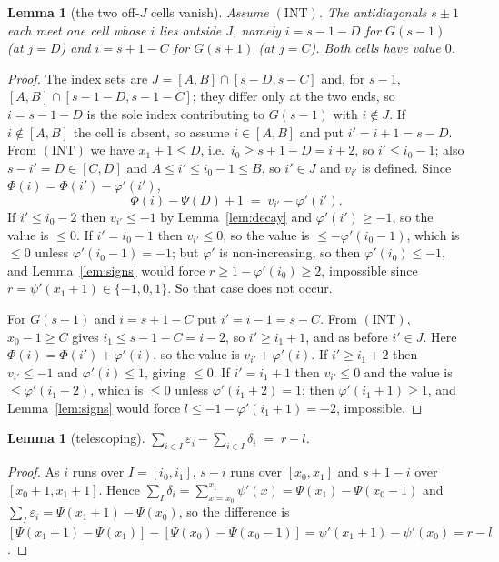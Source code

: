 \documentclass[11pt]{article}
\newtheorem{lemma}[theorem]{Lemma}
\theoremstyle{definition}
\newcommand{\INT}{(\mathrm{INT})}
\begin{document}
\begin{lemma}[the two off-$J$ cells vanish]\label{lem:offJ}
Assume $\INT$. The antidiagonals $s\pm1$ each meet one cell whose $i$ lies outside $J$,
namely $i=s-1-D$ for $G(s-1)$ (at $j=D$) and $i=s+1-C$ for $G(s+1)$ (at $j=C$). Both
cells have value $0$.
\end{lemma}
\begin{proof}
The index sets are $J=[A,B]\cap[s-D,s-C]$ and, for $s-1$, $[A,B]\cap[s-1-D,s-1-C]$; they
differ only at the two ends, so $i=s-1-D$ is the sole index contributing to $G(s-1)$ with
$i\notin J$. If $i\notin[A,B]$ the cell is absent, so assume $i\in[A,B]$ and put
$i'=i+1=s-D$. From $\INT$ we have $x_1+1\le D$, i.e.\ $i_0\ge s+1-D=i+2$, so
$i'\le i_0-1$; also $s-i'=D\in[C,D]$ and $A\le i'\le i_0-1\le B$, so $i'\in J$ and
$v_{i'}$ is defined. Since $\Phi(i)=\Phi(i')-\varphi'(i')$,
\[
  \Phi(i)-\Psi(D)+1 \;=\; v_{i'}-\varphi'(i') .
\]
If $i'\le i_0-2$ then $v_{i'}\le-1$ by Lemma~\ref{lem:decay} and $\varphi'(i')\ge-1$, so
the value is $\le0$. If $i'=i_0-1$ then $v_{i'}\le0$, so the value is
$\le-\varphi'(i_0-1)$, which is $\le0$ unless $\varphi'(i_0-1)=-1$; but $\varphi'$ is
non-increasing, so then $\varphi'(i_0)\le-1$, and Lemma~\ref{lem:signs} would force
$r\ge1-\varphi'(i_0)\ge2$, impossible since $r=\psi'(x_1+1)\in\{-1,0,1\}$. So that case
does not occur.

For $G(s+1)$ and $i=s+1-C$ put $i'=i-1=s-C$. From $\INT$, $x_0-1\ge C$ gives
$i_1\le s-1-C=i-2$, so $i'\ge i_1+1$, and as before $i'\in J$. Here
$\Phi(i)=\Phi(i')+\varphi'(i)$, so the value is $v_{i'}+\varphi'(i)$. If $i'\ge i_1+2$
then $v_{i'}\le-1$ and $\varphi'(i)\le1$, giving $\le0$. If $i'=i_1+1$ then $v_{i'}\le0$
and the value is $\le\varphi'(i_1+2)$, which is $\le0$ unless $\varphi'(i_1+2)=1$; then
$\varphi'(i_1+1)\ge1$, and Lemma~\ref{lem:signs} would force
$l\le-1-\varphi'(i_1+1)=-2$, impossible.
\end{proof}

\begin{lemma}[telescoping]\label{lem:tele}
$\displaystyle\sum_{i\in I}\varepsilon_i-\sum_{i\in I}\delta_i \;=\; r-l$.
\end{lemma}
\begin{proof}
As $i$ runs over $I=[i_0,i_1]$, $s-i$ runs over $[x_0,x_1]$ and $s+1-i$ over
$[x_0+1,x_1+1]$. Hence $\sum_I\delta_i=\sum_{x=x_0}^{x_1}\psi'(x)=\Psi(x_1)-\Psi(x_0-1)$
and $\sum_I\varepsilon_i=\Psi(x_1+1)-\Psi(x_0)$, so the difference is
$[\Psi(x_1+1)-\Psi(x_1)]-[\Psi(x_0)-\Psi(x_0-1)]=\psi'(x_1+1)-\psi'(x_0)=r-l$.
\end{proof}
\end{document}
